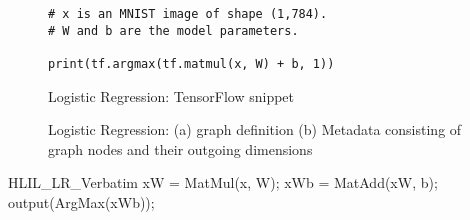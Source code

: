 \begin{figure}
\small
\begin{Verbatim}[frame=single]
# x is an MNIST image of shape (1,784).
# W and b are the model parameters.

print(tf.argmax(tf.matmul(x, W) + b, 1))
\end{Verbatim}
\caption{Logistic Regression: TensorFlow snippet}
\label{fig:lrtf}
\end{figure}


\begin{figure}
  \centering
  \caption{Logistic Regression: (a) \tensorflow graph definition (b) Metadata consisting of graph nodes and their outgoing dimensions}
  \label{fig:lrtfgraphdump}
\end{figure}

\begin{SaveVerbatim}{HLIL_LR_Verbatim}
xW = MatMul(x, W);
xWb = MatAdd(xW, b);
output(ArgMax(xWb));
\end{SaveVerbatim}

